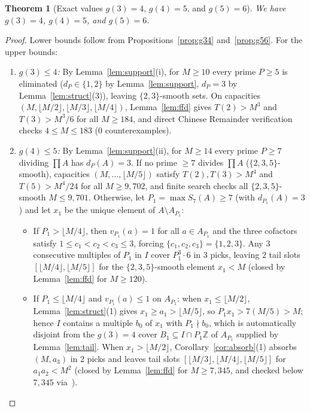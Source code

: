 \documentclass[11pt]{article}
\newtheorem{theorem}{Theorem}
\begin{document}
\begin{theorem}[Exact values $g(3) = 4$, $g(4) = 5$, and $g(5) = 6$]
\label{thm:g345}
We have $g(3) = 4$, $g(4) = 5$, and $g(5) = 6$.
\end{theorem}
\begin{proof}
Lower bounds follow from Propositions~\ref{prop:g34} and~\ref{prop:g56}. For the upper bounds:
\begin{enumerate}
\item \emph{$g(3) \le 4$:} By Lemma~\ref{lem:support}(i), for $M \ge 10$ every prime $P \ge 5$ is eliminated ($d_P \in \{1, 2\}$ by Lemma~\ref{lem:support}, $d_P = 3$ by Lemma~\ref{lem:struct}(3)), leaving $\{2, 3\}$-smooth sets. On capacities $(M, \lfloor M / 2 \rfloor, \lfloor M / 3 \rfloor, \lfloor M / 4 \rfloor)$, Lemma~\ref{lem:ffd} gives $T(2) > M^3$ and $T(3) > M^3 / 6$ for all $M \ge 184$, and direct Chinese Remainder verification checks $4 \le M \le 183$ ($0$ counterexamples).
\item \emph{$g(4) \le 5$:} By Lemma~\ref{lem:support}(ii), for $M \ge 14$ every prime $P \ge 7$ dividing $\prod A$ has $d_P(A) = 3$. If no prime $\ge 7$ divides $\prod A$ ($\{2, 3, 5\}$-smooth), capacities $(M, \dots, \lfloor M / 5 \rfloor)$ satisfy $T(2), T(3) > M^4$ and $T(5) > M^4 / 24$ for all $M \ge 9{,}702$, and finite search checks all $\{2, 3, 5\}$-smooth $M \le 9{,}701$. Otherwise, let $P_1 = \max S_7(A) \ge 7$ (with $d_{P_1}(A) = 3$) and let $x_1$ be the unique element of $A \setminus A_{P_1}$:
\begin{itemize}
\item If $P_1 > \lfloor M / 4 \rfloor$, then $v_{P_1}(a) = 1$ for all $a \in A_{P_1}$ and the three cofactors satisfy $1 \le c_1 < c_2 < c_3 \le 3$, forcing $\{c_1, c_2, c_3\} = \{1, 2, 3\}$. Any $3$ consecutive multiples of $P_1$ in $I$ cover $P_1^3 \cdot 6$ in $3$ picks, leaving $2$ tail slots $[\lfloor M / 4 \rfloor, \lfloor M / 5 \rfloor]$ for the $\{2, 3, 5\}$-smooth element $x_1 < M$ (closed by Lemma~\ref{lem:ffd} for $M \ge 120$).
\item If $P_1 \le \lfloor M / 4 \rfloor$ and $v_{P_1}(a) \le 1$ on $A_{P_1}$: when $x_1 \le \lfloor M / 2 \rfloor$, Lemma~\ref{lem:struct}(1) gives $x_1 \ge a_1 > \lfloor M / 5 \rfloor$, so $P_1 x_1 > 7(M / 5) > M$; hence $I$ contains a multiple $b_0$ of $x_1$ with $P_1 \nmid b_0$, which is automatically disjoint from the $g(3) = 4$ cover $B_1 \subseteq I \cap P_1 \mathbb{Z}$ of $A_{P_1}$ supplied by Lemma~\ref{lem:tail}. When $x_1 > \lfloor M / 2 \rfloor$, Corollary~\ref{cor:absorb}(1) absorbs $(M, a_3)$ in $2$ picks and leaves tail slots $[\lfloor M / 3 \rfloor, \lfloor M / 4 \rfloor, \lfloor M / 5 \rfloor]$ for $a_1 a_2 < M^2$ (closed by Lemma~\ref{lem:ffd} for $M \ge 7{,}345$, and checked below $7{,}345$ via~\cite{bergstrom26smallcode}).

\end{itemize}
\end{enumerate}
\end{proof}
\end{document}
